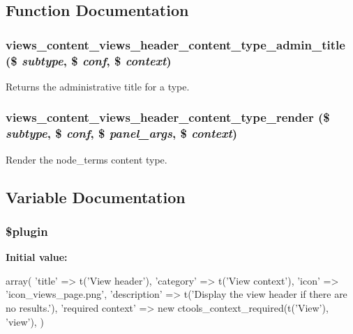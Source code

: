 \subsection{Function Documentation}
\hypertarget{views__header_8inc_aa2c11f517a4685017461c36dba11523c}{
\subsubsection[{views\_\-content\_\-views\_\-header\_\-content\_\-type\_\-admin\_\-title}]{\setlength{\rightskip}{0pt plus 5cm}views\_\-content\_\-views\_\-header\_\-content\_\-type\_\-admin\_\-title (\$ {\em subtype}, \/  \$ {\em conf}, \/  \$ {\em context})}}
\label{views__header_8inc_aa2c11f517a4685017461c36dba11523c}
Returns the administrative title for a type. \hypertarget{views__header_8inc_a7fe3f76daf36a922a0b8a45d68091f54}{
\subsubsection[{views\_\-content\_\-views\_\-header\_\-content\_\-type\_\-render}]{\setlength{\rightskip}{0pt plus 5cm}views\_\-content\_\-views\_\-header\_\-content\_\-type\_\-render (\$ {\em subtype}, \/  \$ {\em conf}, \/  \$ {\em panel\_\-args}, \/  \$ {\em context})}}
\label{views__header_8inc_a7fe3f76daf36a922a0b8a45d68091f54}
Render the node\_\-terms content type. 

\subsection{Variable Documentation}
\hypertarget{views__header_8inc_ada8a7130088351710bb02ed622d6bf65}{
\subsubsection[{\$plugin}]{\setlength{\rightskip}{0pt plus 5cm}\$plugin}}
\label{views__header_8inc_ada8a7130088351710bb02ed622d6bf65}
{\bfseries Initial value:}
\begin{DoxyCode}
 array(
  'title' => t('View header'),
  'category' => t('View context'),
  'icon' => 'icon_views_page.png',
  'description' => t('Display the view header if there are no results.'),
  'required context' => new ctools_context_required(t('View'), 'view'),
)
\end{DoxyCode}
